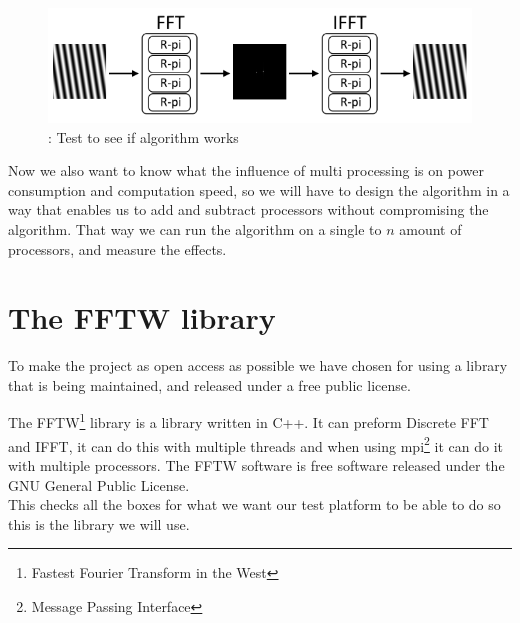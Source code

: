 \documentclass[11pt, A4, oneside]{article}
\begin{document}
\begin{figure}[!ht]
	\centering
	\includegraphics[width=\linewidth]{algorithm_test}
	\caption{: Test to see if algorithm works}
	\label{algorithm test}
\end{figure}

Now we also want to know what the influence of multi processing is on power consumption and computation speed, so we will have to design the algorithm in a way that enables us to add and subtract processors without compromising the algorithm. That way we can run the algorithm on a single to \(n\) amount of processors, and measure the effects. 

\newpage

\section{The FFTW library}

To make the project as open access as possible we have chosen for using a library that is being maintained, and released under a free public license.\par The FFTW\footnote{Fastest Fourier Transform in the West} library is a library written in C++. It can preform Discrete FFT and IFFT, it can do this with multiple threads and when using mpi\footnote{Message Passing Interface} it can do it with multiple processors. The FFTW software is free software released under the GNU General Public License. \\ This checks all the boxes for what we want our test platform to be able to do so this is the library we will use. 





\end{document}
